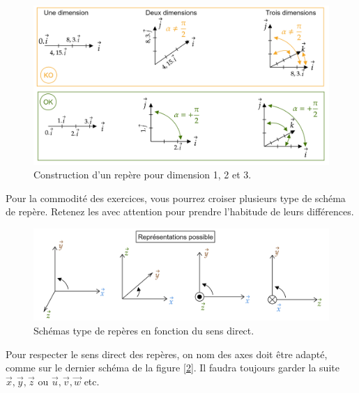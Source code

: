 \documentclass[
	11pt, %
	fleqn, %
	a4paper, %
]{LegrandOrangeBook}
\begin{document}
\begin{figure}[H] %
	\centering %
	\includegraphics[width=1\textwidth]{Images/repere2.png} %
	\caption{Construction d'un repère pour dimension 1, 2 et 3.}
	\label{repere2} %
\end{figure}

Pour la commodité des exercices, vous pourrez croiser plusieurs type de schéma de repère. Retenez les avec attention pour prendre l'habitude de leurs différences. 


\begin{figure}[H] %
	\centering %
	\includegraphics[width=1\textwidth]{Images/repere3.png} %
	\caption{Schémas type de repères en fonction du sens direct.}
	\label{repere3} %
\end{figure}

Pour respecter le sens direct des repères, on nom des axes doit être adapté, comme sur le dernier schéma de la figure [\ref{repere3}]. Il faudra toujours garder la suite $\Vec{x}, \Vec{y}, \Vec{z}$ ou $\Vec{u}, \Vec{v}, \Vec{w}$ etc.
\end{document}
